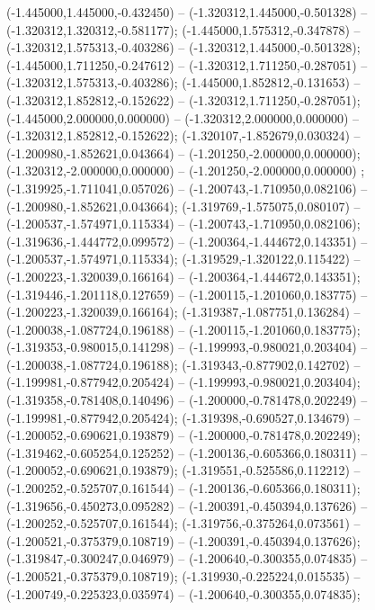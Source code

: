  (-1.445000,1.445000,-0.432450) -- (-1.320312,1.445000,-0.501328) -- (-1.320312,1.320312,-0.581177);
 (-1.445000,1.575312,-0.347878) -- (-1.320312,1.575313,-0.403286) -- (-1.320312,1.445000,-0.501328);
 (-1.445000,1.711250,-0.247612) -- (-1.320312,1.711250,-0.287051) -- (-1.320312,1.575313,-0.403286);
 (-1.445000,1.852812,-0.131653) -- (-1.320312,1.852812,-0.152622) -- (-1.320312,1.711250,-0.287051);
 (-1.445000,2.000000,0.000000) -- (-1.320312,2.000000,0.000000) -- (-1.320312,1.852812,-0.152622);
 (-1.320107,-1.852679,0.030324) -- (-1.200980,-1.852621,0.043664) -- (-1.201250,-2.000000,0.000000);
 (-1.320312,-2.000000,0.000000) -- (-1.201250,-2.000000,0.000000) ;
 (-1.319925,-1.711041,0.057026) -- (-1.200743,-1.710950,0.082106) -- (-1.200980,-1.852621,0.043664);
 (-1.319769,-1.575075,0.080107) -- (-1.200537,-1.574971,0.115334) -- (-1.200743,-1.710950,0.082106);
 (-1.319636,-1.444772,0.099572) -- (-1.200364,-1.444672,0.143351) -- (-1.200537,-1.574971,0.115334);
 (-1.319529,-1.320122,0.115422) -- (-1.200223,-1.320039,0.166164) -- (-1.200364,-1.444672,0.143351);
 (-1.319446,-1.201118,0.127659) -- (-1.200115,-1.201060,0.183775) -- (-1.200223,-1.320039,0.166164);
 (-1.319387,-1.087751,0.136284) -- (-1.200038,-1.087724,0.196188) -- (-1.200115,-1.201060,0.183775);
 (-1.319353,-0.980015,0.141298) -- (-1.199993,-0.980021,0.203404) -- (-1.200038,-1.087724,0.196188);
 (-1.319343,-0.877902,0.142702) -- (-1.199981,-0.877942,0.205424) -- (-1.199993,-0.980021,0.203404);
 (-1.319358,-0.781408,0.140496) -- (-1.200000,-0.781478,0.202249) -- (-1.199981,-0.877942,0.205424);
 (-1.319398,-0.690527,0.134679) -- (-1.200052,-0.690621,0.193879) -- (-1.200000,-0.781478,0.202249);
 (-1.319462,-0.605254,0.125252) -- (-1.200136,-0.605366,0.180311) -- (-1.200052,-0.690621,0.193879);
 (-1.319551,-0.525586,0.112212) -- (-1.200252,-0.525707,0.161544) -- (-1.200136,-0.605366,0.180311);
 (-1.319656,-0.450273,0.095282) -- (-1.200391,-0.450394,0.137626) -- (-1.200252,-0.525707,0.161544);
 (-1.319756,-0.375264,0.073561) -- (-1.200521,-0.375379,0.108719) -- (-1.200391,-0.450394,0.137626);
 (-1.319847,-0.300247,0.046979) -- (-1.200640,-0.300355,0.074835) -- (-1.200521,-0.375379,0.108719);
 (-1.319930,-0.225224,0.015535) -- (-1.200749,-0.225323,0.035974) -- (-1.200640,-0.300355,0.074835);
